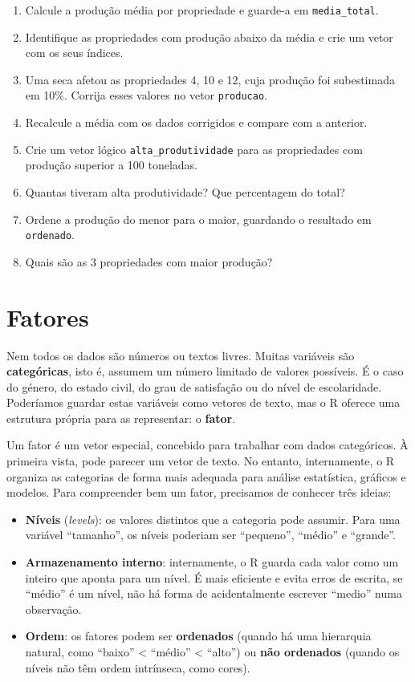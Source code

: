 \documentclass[
  portuguese,
  11pt,
  openany]{book}
\providecommand{\tightlist}{%
  \setlength{\itemsep}{0pt}\setlength{\parskip}{0pt}}
\begin{document}
\begin{enumerate}
\def\labelenumi{(\alph{enumi})}
\setcounter{enumi}{1}
\tightlist
\item
  Calcule a produção média por propriedade e guarde-a em \texttt{media\_total}.
\item
  Identifique as propriedades com produção abaixo da média e crie um vetor com
  os seus índices.
\item
  Uma seca afetou as propriedades 4, 10 e 12, cuja produção foi subestimada em
  10\%. Corrija esses valores no vetor \texttt{producao}.
\item
  Recalcule a média com os dados corrigidos e compare com a anterior.
\item
  Crie um vetor lógico \texttt{alta\_produtividade} para as propriedades com produção
  superior a 100 toneladas.
\item
  Quantas tiveram alta produtividade? Que percentagem do total?
\item
  Ordene a produção do menor para o maior, guardando o resultado em \texttt{ordenado}.
\item
  Quais são as 3 propriedades com maior produção?
\end{enumerate}

\section{Fatores}\label{fatores}

Nem todos os dados são números ou textos livres. Muitas variáveis são \textbf{categóricas}, isto é, assumem um número limitado de valores possíveis. É o caso do género, do estado civil, do grau de satisfação ou do nível de escolaridade. Poderíamos guardar estas variáveis como vetores de texto, mas o R oferece uma estrutura própria para as representar: o \textbf{fator}.

Um fator é um vetor especial, concebido para trabalhar com dados categóricos. À primeira vista, pode parecer um vetor de texto. No entanto, internamente, o R organiza as categorias de forma mais adequada para análise estatística, gráficos e modelos. Para compreender bem um fator, precisamos de conhecer três ideias:

\begin{itemize}
\tightlist
\item
  \textbf{Níveis} (\emph{levels}): os valores distintos que a categoria pode assumir. Para
  uma variável ``tamanho'', os níveis poderiam ser ``pequeno'', ``médio'' e ``grande''.
\item
  \textbf{Armazenamento interno}: internamente, o R guarda cada valor como um inteiro
  que aponta para um nível. É mais eficiente e evita erros de escrita, se ``médio''
  é um nível, não há forma de acidentalmente escrever ``medio'' numa observação.
\item
  \textbf{Ordem}: os fatores podem ser \textbf{ordenados} (quando há uma hierarquia natural,
  como ``baixo'' \textless{} ``médio'' \textless{} ``alto'') ou \textbf{não ordenados} (quando os níveis não têm
  ordem intrínseca, como cores).
\end{itemize}
\end{document}
